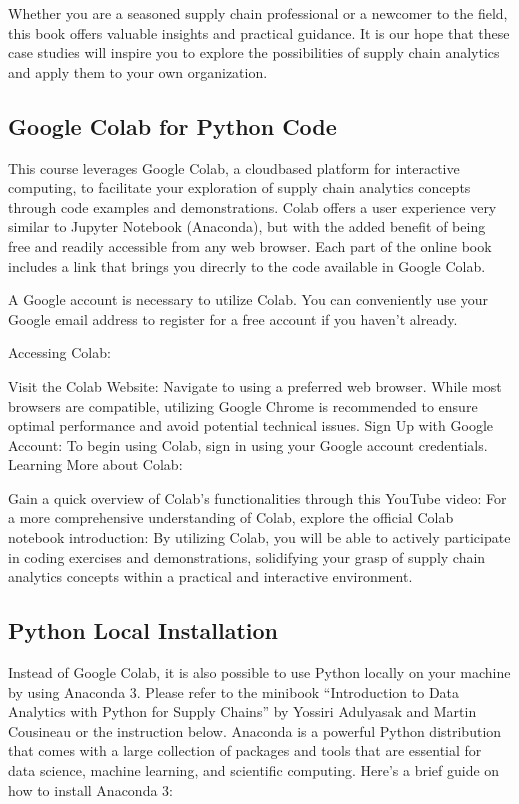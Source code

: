 \documentclass[letterpaper,10pt,english]{jupyterBook}
\begin{document}
\sphinxAtStartPar
Whether you are a seasoned supply chain professional or a newcomer to the field, this book offers valuable insights and practical guidance. It is our hope that these case studies will inspire you to explore the possibilities of supply chain analytics and apply them to your own organization.


\subsection{Google Colab for Python Code}
\label{\detokenize{docs/introduction:google-colab-for-python-code}}
\sphinxAtStartPar
This course leverages Google Colab, a cloud\sphinxhyphen{}based platform for interactive computing, to facilitate your exploration of supply chain analytics concepts through code examples and demonstrations. Colab offers a user experience very similar to Jupyter Notebook (Anaconda), but with the added benefit of being free and readily accessible from any web browser. Each part of the online book includes a link that brings you direcrly to the code available in Google Colab.

\sphinxAtStartPar
A Google account is necessary to utilize Colab. You can conveniently use your Google email address to register for a free account if you haven’t already.

\sphinxAtStartPar
Accessing Colab:

\sphinxAtStartPar
Visit the Colab Website: Navigate to  using a preferred web browser. While most browsers are compatible, utilizing Google Chrome is recommended to ensure optimal performance and avoid potential technical issues.
Sign Up with Google Account: To begin using Colab, sign in using your Google account credentials.
Learning More about Colab:

\sphinxAtStartPar
{} Gain a quick overview of Colab’s functionalities through this YouTube video: 
 For a more comprehensive understanding of Colab, explore the official Colab notebook introduction: 
By utilizing Colab, you will be able to actively participate in coding exercises and demonstrations, solidifying your grasp of supply chain analytics concepts within a practical and interactive environment.


\subsection{Python Local Installation}
\label{\detokenize{docs/introduction:python-local-installation}}
\sphinxAtStartPar
Instead of Google Colab, it is also possible to use Python locally on your machine by using Anaconda 3. Please refer to the mini\sphinxhyphen{}book “Introduction to Data Analytics with Python for Supply Chains” by Yossiri Adulyasak and Martin Cousineau or the instruction below. Anaconda is a powerful Python distribution that comes with a large collection of packages and tools that are essential for data science, machine learning, and scientific computing. Here’s a brief guide on how to install Anaconda 3:
\end{document}
